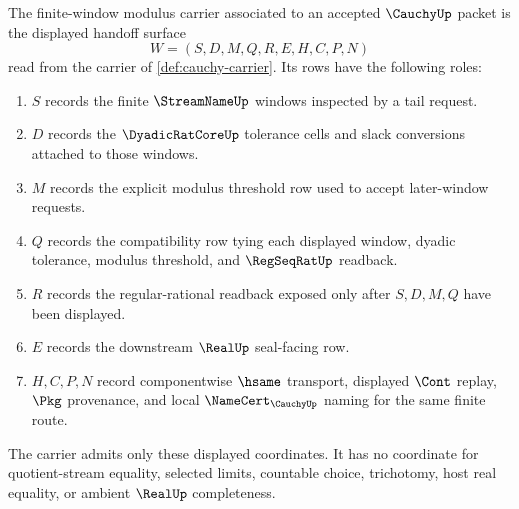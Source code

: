 \begin{definition}
\label{def:cauchy-finite-window-modulus-carrier}
The finite-window modulus carrier associated to an accepted $\CauchyUp$ packet is the displayed handoff surface
$$
W=(S,D,M,Q,R,E,H,C,P,N)
$$
read from the carrier of \autoref{def:cauchy-carrier}. Its rows have the following roles:
\begin{enumerate}
\item $S$ records the finite $\StreamNameUp$ windows inspected by a tail request.
\item $D$ records the $\DyadicRatCoreUp$ tolerance cells and slack conversions attached to those windows.
\item $M$ records the explicit modulus threshold row used to accept later-window requests.
\item $Q$ records the compatibility row tying each displayed window, dyadic tolerance, modulus threshold, and $\RegSeqRatUp$ readback.
\item $R$ records the regular-rational readback exposed only after $S,D,M,Q$ have been displayed.
\item $E$ records the downstream $\RealUp$ seal-facing row.
\item $H,C,P,N$ record componentwise $\hsame$ transport, displayed $\Cont$ replay, $\Pkg$ provenance, and local $\NameCert_{\CauchyUp}$ naming for the same finite route.
\end{enumerate}
The carrier admits only these displayed coordinates. It has no coordinate for quotient-stream equality, selected limits, countable choice, trichotomy, host real equality, or ambient $\RealUp$ completeness.
\end{definition}

